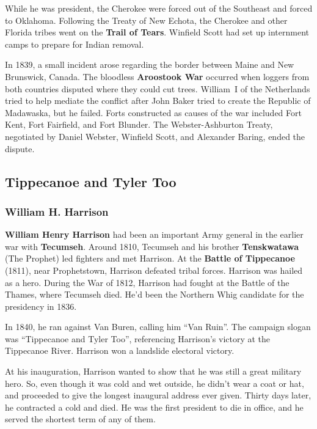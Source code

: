 While he was president, the Cherokee were forced out of the Southeast and forced to Oklahoma.
Following the Treaty of New Echota, the Cherokee and other Florida tribes went on the \textbf{Trail of Tears}.
Winfield Scott had set up internment camps to prepare for Indian removal.

In 1839, a small incident arose regarding the border between Maine and New Brunswick, Canada.
The bloodless \textbf{Aroostook War} occurred when loggers from both countries disputed where they could cut trees.
William~I of the Netherlands tried to help mediate the conflict
after John Baker tried to create the Republic of Madawaska, but he failed.
Forts constructed as causes of the war included Fort Kent, Fort Fairfield, and Fort Blunder.
The Webster-Ashburton Treaty, negotiated by Daniel Webster, Winfield Scott, and Alexander Baring, ended the dispute.

\subsection*{Tippecanoe and Tyler Too}

\subsubsection*{William H. Harrison}

\textbf{William Henry Harrison} had been an important Army general in the earlier war with \textbf{Tecumseh}.
Around 1810, Tecumseh and his brother \textbf{Tenskwatawa} (The Prophet) led fighters and met Harrison.
At the \textbf{Battle of Tippecanoe} (1811), near Prophetstown, Harrison defeated tribal forces.
Harrison was hailed as a hero.
During the War of 1812, Harrison had fought at the Battle of the Thames, where Tecumseh died.
He'd been the Northern Whig candidate for the presidency in 1836.

In 1840, he ran against Van Buren, calling him ``Van Ruin''.
The campaign slogan was ``Tippecanoe and Tyler Too'', referencing Harrison's victory at the Tippecanoe River.
Harrison won a landslide electoral victory.

At his inauguration, Harrison wanted to show that he was still a great military hero.
So, even though it was cold and wet outside, he didn't wear a coat or hat,
and proceeded to give the longest inaugural address ever given.
Thirty days later, he contracted a cold and died.
He was the first president to die in office, and he served the shortest term of any of them.

